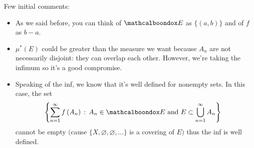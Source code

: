 Few initial comments:
\begin{itemize}
    \item As we said before, you can think of $\bondox{E}$ as $\{(a,b)\}$ and of $f$ as $b-a$.

    \item $\mu^*(E)$ could be greater than the measure we want because $A_n$ are not necessarily disjoint: they can overlap each other. However, we're taking the infimum so it's a good compromise.

    \item Speaking of the inf, we know that it's well defined for nonempty sets. In this case, the set
    \begin{equation*}
    \left\{\sum^{\infty}_{n=1}f\left( A_n \right)\,:\,A_n\in\bondox{E}\text{ and }E\subset\bigcup_{n=1}^{\infty}A_n \right\}
    \end{equation*}
    cannot be empty $\big($cause $\{X,\varnothing,\varnothing,...\}$ is a covering of $E$$\big)$ thus the inf is well defined.
\end{itemize}

